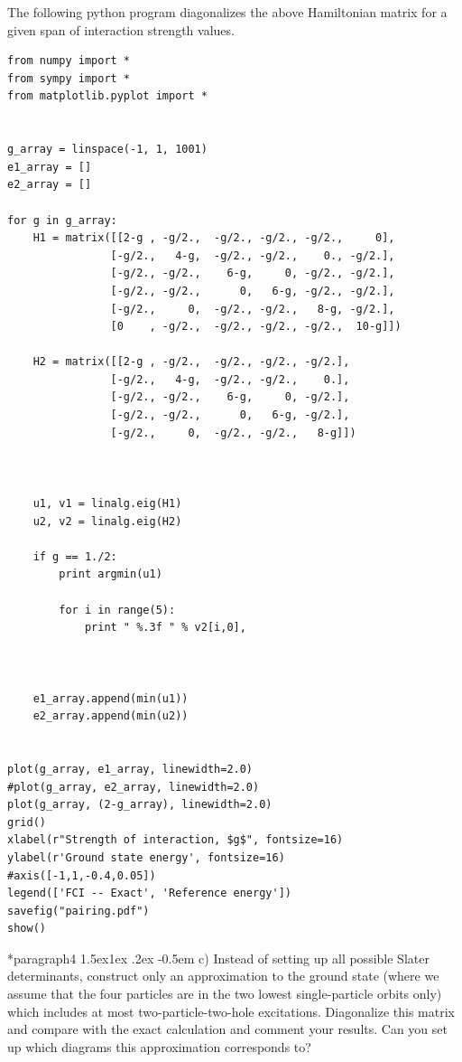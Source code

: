 \documentclass[%
twoside,                 %
final,                   %
10pt]{article}
\makeatletter
\newenvironment{doconceexercise}{}{}
\newcommand\subex{\@startsection*{paragraph}{4}{\z@}%
                  {1.5ex\@plus1ex \@minus.2ex}%
                  {-0.5em}%
                  {\normalfont\normalsize\bfseries}}
\makeatother
\begin{document}
\begin{doconceexercise}
The following python program diagonalizes the above Hamiltonian matrix for a given span of interaction strength values.
\begin{verbatim}
from numpy import *
from sympy import *
from matplotlib.pyplot import *


g_array = linspace(-1, 1, 1001)
e1_array = []
e2_array = []

for g in g_array:
	H1 = matrix([[2-g , -g/2.,  -g/2., -g/2., -g/2.,     0], 
		        [-g/2.,   4-g,  -g/2., -g/2.,    0., -g/2.],
		        [-g/2., -g/2.,    6-g,     0, -g/2., -g/2.],
				[-g/2., -g/2.,      0,   6-g, -g/2., -g/2.],
				[-g/2.,     0,  -g/2., -g/2.,   8-g, -g/2.],
				[0    , -g/2.,  -g/2., -g/2., -g/2.,  10-g]]) 

	H2 = matrix([[2-g , -g/2.,  -g/2., -g/2., -g/2.], 
		        [-g/2.,   4-g,  -g/2., -g/2.,    0.],
		        [-g/2., -g/2.,    6-g,     0, -g/2.],
				[-g/2., -g/2.,      0,   6-g, -g/2.],
				[-g/2.,     0,  -g/2., -g/2.,   8-g]]) 

		

	u1, v1 = linalg.eig(H1)
	u2, v2 = linalg.eig(H2)

	if g == 1./2:
		print argmin(u1)

		for i in range(5):
			print " %.3f " % v2[i,0],



	e1_array.append(min(u1))
	e2_array.append(min(u2))


plot(g_array, e1_array, linewidth=2.0)
#plot(g_array, e2_array, linewidth=2.0)
plot(g_array, (2-g_array), linewidth=2.0)
grid()
xlabel(r"Strength of interaction, $g$", fontsize=16)
ylabel(r'Ground state energy', fontsize=16)
#axis([-1,1,-0.4,0.05])
legend(['FCI -- Exact', 'Reference energy'])
savefig("pairing.pdf")
show()
\end{verbatim}


\subex{c)}
Instead of setting up all possible Slater determinants, construct only
an approximation to the ground state (where we assume that the four
particles are in the two lowest single-particle orbits only) which
includes at most two-particle-two-hole excitations. Diagonalize this
matrix and compare with the exact calculation and comment your
results. Can you set up which diagrams this approximation corresponds
to?



\end{doconceexercise}
\end{document}
